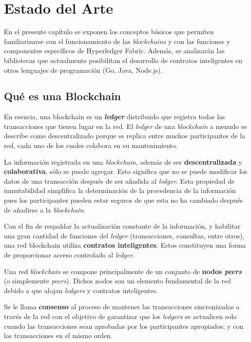 \chapter{Estado del Arte}\label{chapter:state-of-the-art}

En el presente capítulo se exponen los conceptos básicos que permiten familiarizarse con el funcionamiento de las \textit{blockchains} y con las funciones y componentes específicos de Hyperledger Fabric. Además, se analizarán las bibliotecas que  actualmente posibilitan el desarrollo de contratos inteligentes en otros lenguajes de programación (Go, Java, Node.js).

\section{Qué es una Blockchain}
En esencia, una blockchain es un \textbf{\textit{ledger}} distribuido que registra todas las transacciones que tienen lugar en la red. El \textit{ledger} de una \textit{blockchain} a menudo se describe como descentralizado porque se replica entre muchos participantes de la red, cada uno de los cuales colabora en su mantenimiento.

La información registrada en una \textit{blockchain}, además de ser \textbf{descentralizada} y \textbf{colaborativa}, sólo se puede agregar. Esto significa que no se puede modificar los datos de una transacción después de ser añadida al \textit{ledger}. Esta propiedad de inmutabilidad simplifica la determinación de la procedencia de la información pues los participantes pueden estar seguros de que esta no ha cambiado después de añadirse a la \textit{blockchain}.

Con el fin de respaldar la actualización constante de la información, y  habilitar una gran cantidad de funciones del \textit{ledger} (transacciones, consultas, entre otros), una red  blockchain utiliza \textbf{contratos inteligentes}. Estos constituyen una forma de proporcionar acceso controlado al \textit{ledger}.

Una red  \textit{blockchain} se compone principalmente de un conjunto de \textbf{nodos \textit{peers}} (o simplemente \textit{peers}). Dichos nodos son un elemento fundamental de la red debido a que alojan \textit{ledgers} y contratos inteligentes.

Se le llama \textbf{consenso} al proceso de mantener las transacciones sincronizadas a través de la red con el objetivo de garantizar que los \textit{ledgers} se actualicen solo cuando las transacciones sean aprobadas por los participantes apropiados; y con las transacciones en el mismo orden.

